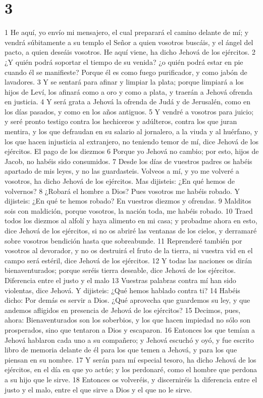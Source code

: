 \chapter{3}


1 He aquí, yo envío mi mensajero, el cual preparará el camino delante de mí; y vendrá súbitamente a su templo el Señor a quien vosotros buscáis, y el ángel del pacto, a quien deseáis vosotros. He aquí viene, ha dicho Jehová de los ejércitos.
2 ¿Y quién podrá soportar el tiempo de su venida? ¿o quién podrá estar en pie cuando él se manifieste? Porque él es como fuego purificador, y como jabón de lavadores.
3 Y se sentará para afinar y limpiar la plata; porque limpiará a los hijos de Leví, los afinará como a oro y como a plata, y traerán a Jehová ofrenda en justicia.
4 Y será grata a Jehová la ofrenda de Judá y de Jerusalén, como en los días pasados, y como en los años antiguos.
5 Y vendré a vosotros para juicio; y seré pronto testigo contra los hechiceros y adúlteros, contra los que juran mentira, y los que defraudan en su salario al jornalero, a la viuda y al huérfano, y los que hacen injusticia al extranjero, no teniendo temor de mí, dice Jehová de los ejércitos.
El pago de los diezmos
6 Porque yo Jehová no cambio; por esto, hijos de Jacob, no habéis sido consumidos. 
7 Desde los días de vuestros padres os habéis apartado de mis leyes, y no las guardasteis. Volveos a mí, y yo me volveré a vosotros, ha dicho Jehová de los ejércitos. Mas dijisteis: ¿En qué hemos de volvernos?
8 ¿Robará el hombre a Dios? Pues vosotros me habéis robado. Y dijisteis: ¿En qué te hemos robado? En vuestros diezmos y ofrendas.
9 Malditos sois con maldición, porque vosotros, la nación toda, me habéis robado.
10 Traed todos los diezmos al alfolí y haya alimento en mi casa; y probadme ahora en esto, dice Jehová de los ejércitos, si no os abriré las ventanas de los cielos, y derramaré sobre vosotros bendición hasta que sobreabunde.
11 Reprenderé también por vosotros al devorador, y no os destruirá el fruto de la tierra, ni vuestra vid en el campo será estéril, dice Jehová de los ejércitos.
12 Y todas las naciones os dirán bienaventurados; porque seréis tierra deseable, dice Jehová de los ejércitos.
Diferencia entre el justo y el malo
13 Vuestras palabras contra mí han sido violentas, dice Jehová. Y dijisteis: ¿Qué hemos hablado contra ti?
14 Habéis dicho: Por demás es servir a Dios. ¿Qué aprovecha que guardemos su ley, y que andemos afligidos en presencia de Jehová de los ejércitos?
15 Decimos, pues, ahora: Bienaventurados son los soberbios, y los que hacen impiedad no sólo son prosperados, sino que tentaron a Dios y escaparon.
16 Entonces los que temían a Jehová hablaron cada uno a su compañero; y Jehová escuchó y oyó, y fue escrito libro de memoria delante de él para los que temen a Jehová, y para los que piensan en su nombre.
17 Y serán para mí especial tesoro, ha dicho Jehová de los ejércitos, en el día en que yo actúe; y los perdonaré, como el hombre que perdona a su hijo que le sirve.
18 Entonces os volveréis, y discerniréis la diferencia entre el justo y el malo, entre el que sirve a Dios y el que no le sirve.

